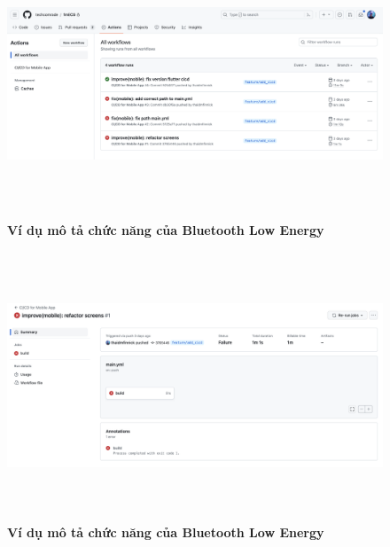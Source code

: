 \begin{figure}[H]
  \centering
  \includegraphics[width=16cm,height=8cm]{Images/mobile_app/demo/all_case_ci_cd.png}
  \caption[Ví dụ mô tả chức năng của Bluetooth Low Energy]{\bfseries \fontsize{12pt}{0pt}
  \selectfont Ví dụ mô tả chức năng của Bluetooth Low Energy}
  \label{demo} %
\end{figure}

\begin{figure}[H]
  \centering
  \includegraphics[width=16cm,height=8cm]{Images/mobile_app/demo/case_error_ci_cd.png}
  \caption[Ví dụ mô tả chức năng của Bluetooth Low Energy]{\bfseries \fontsize{12pt}{0pt}
  \selectfont Ví dụ mô tả chức năng của Bluetooth Low Energy}
  \label{demo} %
\end{figure}

